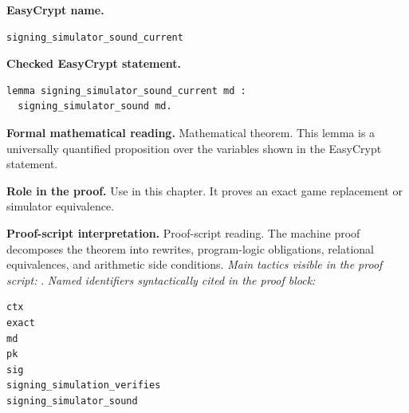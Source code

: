 \begin{formaltheorem}
\noindent\textbf{EasyCrypt name.}
\begin{lstlisting}[language=EasyCrypt,basicstyle=\ttfamily\scriptsize]
signing_simulator_sound_current
\end{lstlisting}
\noindent\textbf{Checked EasyCrypt statement.}
\begin{lstlisting}[language=EasyCrypt,basicstyle=\ttfamily\scriptsize]
lemma signing_simulator_sound_current md :
  signing_simulator_sound md.
\end{lstlisting}
\noindent\textbf{Formal mathematical reading.}
Mathematical theorem. This lemma is a universally quantified proposition over the variables shown in the EasyCrypt statement.

\noindent\textbf{Role in the proof.}
Use in this chapter. It proves an exact game replacement or simulator equivalence.

\noindent\textbf{Proof-script interpretation.}
Proof-script reading. The machine proof decomposes the theorem into rewrites, program-logic obligations, relational equivalences, and arithmetic side conditions.
\emph{Main tactics visible in the proof script:} .
\emph{Named identifiers syntactically cited in the proof block:}
\begin{lstlisting}[language=EasyCrypt,basicstyle=\ttfamily\scriptsize]
ctx
exact
md
pk
sig
signing_simulation_verifies
signing_simulator_sound
\end{lstlisting}

\end{formaltheorem}


